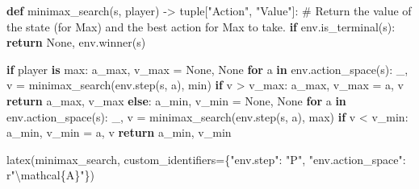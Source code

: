 \documentclass[
  letterpaper,
  DIV=11,
  numbers=noendperiod]{scrreprt}
\newenvironment{Shaded}{\begin{snugshade}}{\end{snugshade}}
\newcommand{\BuiltInTok}[1]{\textcolor[rgb]{0.00,0.23,0.31}{#1}}
\newcommand{\CommentTok}[1]{\textcolor[rgb]{0.37,0.37,0.37}{#1}}
\newcommand{\ControlFlowTok}[1]{\textcolor[rgb]{0.00,0.23,0.31}{\textbf{#1}}}
\newcommand{\KeywordTok}[1]{\textcolor[rgb]{0.00,0.23,0.31}{\textbf{#1}}}
\newcommand{\NormalTok}[1]{\textcolor[rgb]{0.00,0.23,0.31}{#1}}
\newcommand{\OperatorTok}[1]{\textcolor[rgb]{0.37,0.37,0.37}{#1}}
\newcommand{\SpecialCharTok}[1]{\textcolor[rgb]{0.37,0.37,0.37}{#1}}
\newcommand{\StringTok}[1]{\textcolor[rgb]{0.13,0.47,0.30}{#1}}
\newcommand{\VariableTok}[1]{\textcolor[rgb]{0.07,0.07,0.07}{#1}}
\newcommand{\VerbatimStringTok}[1]{\textcolor[rgb]{0.13,0.47,0.30}{#1}}
\theoremstyle{plain}
\theoremstyle{plain}
\theoremstyle{definition}
\theoremstyle{definition}
\theoremstyle{remark}
\begin{document}
\begin{Shaded}
\begin{Highlighting}[]
\KeywordTok{def}\NormalTok{ minimax\_search(s, player) }\OperatorTok{{-}\textgreater{}} \BuiltInTok{tuple}\NormalTok{[}\StringTok{"Action"}\NormalTok{, }\StringTok{"Value"}\NormalTok{]:}
    \CommentTok{\# Return the value of the state (for Max) and the best action for Max to take.}
    \ControlFlowTok{if}\NormalTok{ env.is\_terminal(s):}
        \ControlFlowTok{return} \VariableTok{None}\NormalTok{, env.winner(s)}

    \ControlFlowTok{if}\NormalTok{ player }\KeywordTok{is} \BuiltInTok{max}\NormalTok{:}
\NormalTok{        a\_max, v\_max }\OperatorTok{=} \VariableTok{None}\NormalTok{, }\VariableTok{None}
        \ControlFlowTok{for}\NormalTok{ a }\KeywordTok{in}\NormalTok{ env.action\_space(s):}
\NormalTok{            \_, v }\OperatorTok{=}\NormalTok{ minimax\_search(env.step(s, a), }\BuiltInTok{min}\NormalTok{)}
            \ControlFlowTok{if}\NormalTok{ v }\OperatorTok{\textgreater{}}\NormalTok{ v\_max:}
\NormalTok{                a\_max, v\_max }\OperatorTok{=}\NormalTok{ a, v}
        \ControlFlowTok{return}\NormalTok{ a\_max, v\_max}
    \ControlFlowTok{else}\NormalTok{:}
\NormalTok{        a\_min, v\_min }\OperatorTok{=} \VariableTok{None}\NormalTok{, }\VariableTok{None}
        \ControlFlowTok{for}\NormalTok{ a }\KeywordTok{in}\NormalTok{ env.action\_space(s):}
\NormalTok{            \_, v }\OperatorTok{=}\NormalTok{ minimax\_search(env.step(s, a), }\BuiltInTok{max}\NormalTok{)}
            \ControlFlowTok{if}\NormalTok{ v }\OperatorTok{\textless{}}\NormalTok{ v\_min:}
\NormalTok{                a\_min, v\_min }\OperatorTok{=}\NormalTok{ a, v}
        \ControlFlowTok{return}\NormalTok{ a\_min, v\_min}

\NormalTok{latex(minimax\_search, custom\_identifiers}\OperatorTok{=}\NormalTok{\{}\StringTok{"env.step"}\NormalTok{: }\StringTok{"P"}\NormalTok{, }\StringTok{"env.action\_space"}\NormalTok{: }\VerbatimStringTok{r"\textbackslash{}mathcal}\SpecialCharTok{\{A\}}\VerbatimStringTok{"}\NormalTok{\})}
\end{Highlighting}
\end{Shaded}
\end{document}
